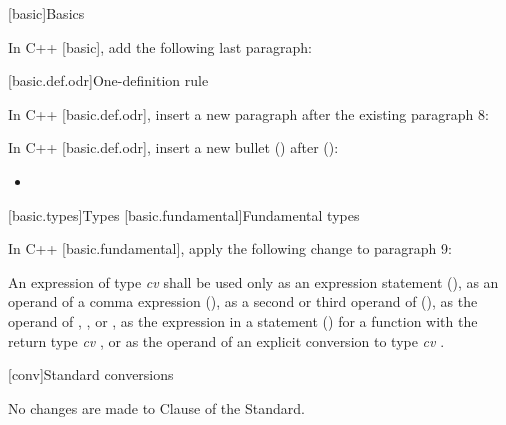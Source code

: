 
[basic]{Basics}

\pnum
In C++ [basic], add the following last paragraph:

\begin{std.txt}
\end{std.txt}



\setcounter{section}{1}
[basic.def.odr]{One-definition rule}

\pnum
In C++ [basic.def.odr], insert a new paragraph after the existing paragraph 8:

\begin{std.txt}
\end{std.txt}

\pnum
In C++ [basic.def.odr], insert a new bullet
() after
():
\begin{std.txt}
\begin{itemize}
\item {}
\end{itemize}
\end{std.txt}

\setcounter{section}{6}
[basic.types]{Types}
[basic.fundamental]{Fundamental types}

\pnum
In C++ [basic.fundamental], apply the following change to paragraph 9:

\begin{std.txt}
An expression of type \emph{cv}  shall be used only as an expression
statement (), as an operand of a comma expression
(), as a second or
third operand of  (), as the operand of ,
,  or , as the
expression in a  statement () for a function with the return type
\emph{cv} , or as the operand of an explicit conversion to type
\emph{cv} .
\end{std.txt}

[conv]{Standard conversions}

No changes are made to Clause \the\value{chapter} of the \Cpp Standard.
